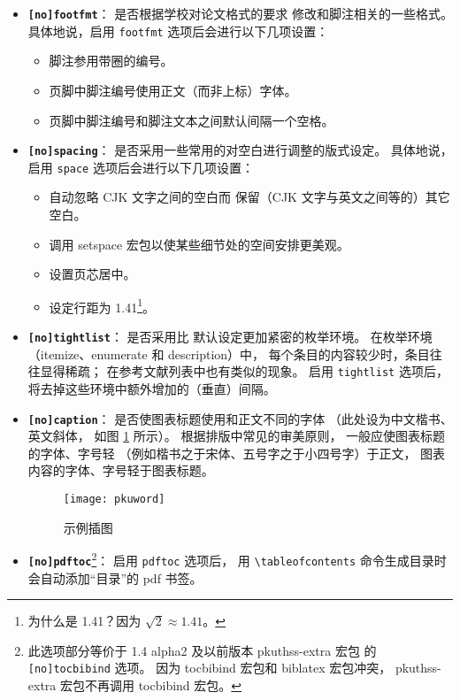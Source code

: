 		\begin{itemize}
			\item \textbf{\texttt{[no]footfmt}}：
				是否根据学校对论文格式的要求\mbox{\supercite{pku-thesisstyle}}%
				修改和脚注相关的一些格式。
				具体地说，启用 \verb|footfmt| 选项后会进行以下几项设置：
			\begin{itemize}
				\item 脚注参用带圈的编号。
				\item 页脚中脚注编号使用正文（而非上标）字体。
				\item 页脚中脚注编号和脚注文本之间默认间隔一个空格。
			\end{itemize}

			\item \textbf{\texttt{[no]spacing}}：
				是否采用一些常用的对空白进行调整的版式设定。
				具体地说，启用 \verb|space| 选项后会进行以下几项设置：
			\begin{itemize}
				\item 自动忽略 CJK 文字之间的空白而%
					保留（CJK 文字与英文之间等的）其它空白。
				\item 调用 setspace 宏包以使某些细节处的空间安排更美观。
				\item 设置页芯居中。
				\item 设定行距为 1.41\footnote{%
					为什么是 1.41？因为 $\sqrt{2}\approx1.41$。%
				}。
			\end{itemize}

			\item \textbf{\texttt{[no]tightlist}}：
				是否采用比  默认设定更加紧密的枚举环境。
				在枚举环境（itemize、enumerate 和 description）中，
				每个条目的内容较少时，条目往往显得稀疏；
				在参考文献列表中也有类似的现象。
				启用 \verb|tightlist| 选项后，
				将去掉这些环境中额外增加的（垂直）间隔。

			\item \textbf{\texttt{[no]caption}}：
				是否使图表标题使用和正文不同的字体
				（此处设为中文楷书、英文斜体，
				如图 \ref{fig:example} 所示）。
				根据排版中常见的审美原则，
				一般应使图表标题的字体、字号轻
				（例如楷书之于宋体、五号字之于小四号字）于正文，
				图表内容的字体、字号轻于图表标题。

			\begin{figure}[htbp!]
				\centering
				\texttt{[image: pkuword]}
				\caption{示例插图}\label{fig:example}
			\end{figure}

			\item \textbf{\texttt{[no]pdftoc}}\footnote{%
					此选项部分等价于 1.4 alpha2 及以前版本 pkuthss-extra 宏包%
					的 \texttt{[no]tocbibind} 选项。
					因为 tocbibind 宏包和 biblatex 宏包冲突，
					pkuthss-extra 宏包不再调用 tocbibind 宏包。%
				}：
				启用 \verb|pdftoc| 选项后，
				用 \verb|\tableofcontents| 命令生成目录时%
				会自动添加“目录”的 pdf 书签。


\end{itemize}

